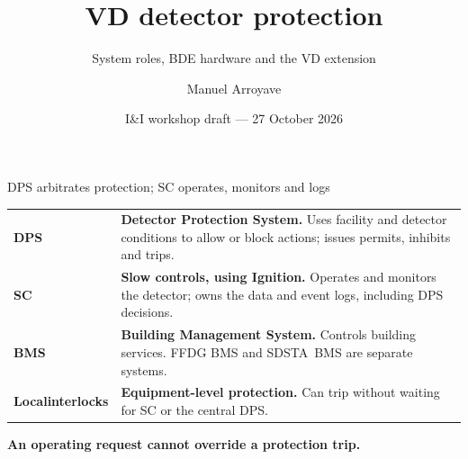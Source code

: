 \documentclass[aspectratio=169,11pt]{beamer}
\title{VD detector protection}
\subtitle{System roles, BDE hardware and the VD extension}
\author{Manuel Arroyave}
\date{I\&I workshop draft --- 27 October 2026}
\begin{document}
\begin{frame}[plain]
  \titlepage
\end{frame}

\begin{frame}{DPS arbitrates protection; SC operates, monitors and logs}
  \renewcommand{\arraystretch}{1.5}
  \begin{tabularx}{\textwidth}{@{}>{\RaggedRight\arraybackslash}p{2.2cm}>{\RaggedRight\arraybackslash}X@{}}
    \textbf{DPS} & \textbf{Detector Protection System.} Uses facility and detector conditions to allow or block actions; issues permits, inhibits and trips.\\
    \textbf{SC} & \textbf{Slow controls, using Ignition.} Operates and monitors the detector; owns the data and event logs, including DPS decisions.\\
    \textbf{BMS} & \textbf{Building Management System.} Controls building services. FFDG BMS and \mbox{SDSTA BMS} are separate systems.\\
    \textbf{Local\newline interlocks} & \textbf{Equipment-level protection.} Can trip without waiting for SC or the central DPS.\\
  \end{tabularx}\par
  \bigskip
  \textbf{An operating request cannot override a protection trip.}
\end{frame}
\end{document}
